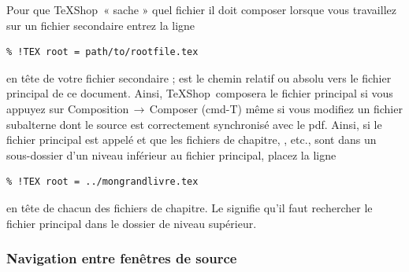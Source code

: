 \documentclass[11pt,french]{article}
\newcommand{\TS}{\textsf{\TeX Shop}}
\newcommand{\acr}[1]{\textsf{#1}}
\newcommand{\cmd}[1]{\textsf{#1}}
\newcommand{\mnu}[1]{\textsf{#1}}
\newcommand{\To}{\,\(\to\)\,}
\begin{document}
Pour que \TS\ « sache » quel fichier il doit composer lorsque vous travaillez sur un fichier secondaire entrez la ligne \begin{verbatim}
% !TEX root = path/to/rootfile.tex
\end{verbatim}
en tête de votre fichier secondaire ;  est le chemin relatif ou absolu vers le fichier principal de ce document. Ainsi, \TS\ composera le fichier principal si vous appuyez sur \mnu{Composition}\To\mnu{Composer} (\cmd{cmd-T}) même si vous modifiez un fichier subalterne dont le source est correctement synchronisé avec le \acr{pdf}. Ainsi, si le fichier principal est appelé  et que les fichiers de chapitre, , etc., sont dans un sous-dossier  d'un niveau inférieur au fichier principal, placez la ligne
\begin{verbatim}
% !TEX root = ../mongrandlivre.tex
\end{verbatim}
en tête de chacun des fichiers de chapitre. Le  signifie qu'il faut rechercher le fichier principal dans le dossier de niveau supérieur.

%

\subsubsection{Navigation entre fenêtres de source}
\end{document}
